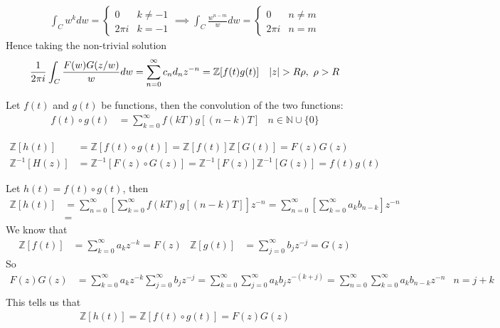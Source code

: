 \documentclass[12pt, english]{book}
\makeatletter
\renewenvironment{proof}[1][\proofname]{\par
	\pushQED{\qed}%
	\normalfont \topsep6\p@\@plus6\p@\relax
	\list{}{%
		\settowidth{\leftmargin}{\itshape\proofname:\hskip\labelsep}%
		\setlength{\labelwidth}{0pt}%
		\setlength{\itemindent}{-\leftmargin}%
	}%
	\item[\hskip\labelsep\itshape#1\@addpunct{:}]\ignorespaces
}{%
	\popQED\endlist\@endpefalse
}
\makeatother
\begin{document}
\begin{proof}
		\begin{align*}
			\int_{C} w^k dw =
			\begin{cases}
				0 & k\neq -1\\
				2\pi i & k = -1
			\end{cases}
			\implies
			\int_{C} \frac{w^{n-m}}{w} dw = 
			\begin{cases}
				0 & n \neq m\\
				2\pi i & n = m
			\end{cases}
		\end{align*}
		Hence taking the non-trivial solution
		\begin{align*}
			\frac{1}{2\pi i} \int_{C} \frac{F(w)G(z/w)}{w} dw
			&= \sum_{n=0}^{\infty} c_n d_n z^{-n} = \mathbb{Z}[f(t)g(t)]
				& \abs{z}> R\rho, \ \rho > R
		\end{align*}
	\end{proof}

	\begin{definition}[Convolution]
		\label{Convolution Definition - Complex}
		Let \(f(t)\) and \(g(t)\) be functions, then the convolution of the two functions:
		\begin{align*}
			f(t) \circ g(t) &= \sum_{k=0}^{\infty} f(kT) g[(n-k)T] & n \in \mathbb{N} \cup \{0\}
		\end{align*}
	\end{definition}

	\begin{definition}
		\begin{align*}
			\mathbb{Z}[h(t)] &= \mathbb{Z}[f(t) \circ g(t)] = \mathbb{Z}[f(t)] \mathbb{Z}[G(t)]= F(z) G(z) \\
			\mathbb{Z}^{-1}[H(z)] &= \mathbb{Z}^{-1}[F(z) \circ G(z)] = \mathbb{Z}^{-1}[F(z)] \mathbb{Z}^{-1}[G(z)] = f(t) g(t)
		\end{align*}
	\end{definition}
	\begin{proof}
		Let \(h(t) = f(t) \circ g(t)\), then 
		\begin{align*}
			\mathbb{Z}[h(t)] 
			&= \sum_{n=0}^{\infty} \left[\sum_{k=0}^{\infty} f(kT) g[(n-k)T] \right] z^{-n} 
			 = \sum_{n=0}^{\infty} \left[\sum_{k=0}^{\infty} a_k b_{n-k} \right] z^{-n} \\
			&= 
		\end{align*}
		We know that 
		\begin{align*}
			\mathbb{Z}[f(t)] &= \sum_{k=0}^{\infty} a_k z^{-k} = F(z) & 
			\mathbb{Z}[g(t)] &= \sum_{j=0}^{\infty} b_j z^{-j} = G(z)
		\end{align*}
		So
		\begin{align*}
			F(z)G(z) &= \sum_{k=0}^{\infty} a_k z^{-k} \sum_{j=0}^{\infty} b_j z^{-j}
					  = \sum_{k=0}^{\infty} \sum_{j=0}^{\infty} a_k b_j z^{-(k+j)} 
					  = \sum_{n=0}^{\infty} \sum_{k=0}^{\infty} a_k b_{n-k} z^{-n} & n = j+k \\
		\end{align*}
		This tells us that 
		\begin{align*}
			\mathbb{Z}[h(t)] = \mathbb{Z}[f(t) \circ g(t)] = F(z) G(z)
		\end{align*}
	\end{proof}
\end{document}
